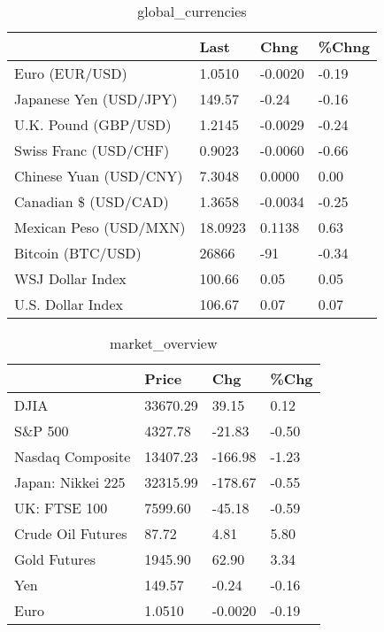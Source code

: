 \documentclass{article}%
\begin{document}
%


\begin{table}[htbp]%
\caption{global\_currencies}%
\centering%
\begin{adjustbox}{width=1\textwidth}%
\begin{tabular}{llll}
\toprule
                       &    Last &    Chng & \%Chng \\
\midrule
        Euro (EUR/USD) &  1.0510 & -0.0020 & -0.19 \\
Japanese Yen (USD/JPY) &  149.57 &   -0.24 & -0.16 \\
  U.K. Pound (GBP/USD) &  1.2145 & -0.0029 & -0.24 \\
 Swiss Franc (USD/CHF) &  0.9023 & -0.0060 & -0.66 \\
Chinese Yuan (USD/CNY) &  7.3048 &  0.0000 &  0.00 \\
  Canadian \$ (USD/CAD) &  1.3658 & -0.0034 & -0.25 \\
Mexican Peso (USD/MXN) & 18.0923 &  0.1138 &  0.63 \\
     Bitcoin (BTC/USD) &   26866 &     -91 & -0.34 \\
      WSJ Dollar Index &  100.66 &    0.05 &  0.05 \\
     U.S. Dollar Index &  106.67 &    0.07 &  0.07 \\
\bottomrule
\end{tabular}
%
\end{adjustbox}%
\end{table}

%


\begin{table}[htbp]%
\caption{market\_overview}%
\centering%
\begin{adjustbox}{width=1\textwidth}%
\begin{tabular}{llll}
\toprule
                  &    Price &     Chg &  \%Chg \\
\midrule
             DJIA & 33670.29 &   39.15 &  0.12 \\
          S\&P 500 &  4327.78 &  -21.83 & -0.50 \\
 Nasdaq Composite & 13407.23 & -166.98 & -1.23 \\
Japan: Nikkei 225 & 32315.99 & -178.67 & -0.55 \\
     UK: FTSE 100 &  7599.60 &  -45.18 & -0.59 \\
Crude Oil Futures &    87.72 &    4.81 &  5.80 \\
     Gold Futures &  1945.90 &   62.90 &  3.34 \\
              Yen &   149.57 &   -0.24 & -0.16 \\
             Euro &   1.0510 & -0.0020 & -0.19 \\
\bottomrule
\end{tabular}
%
\end{adjustbox}%
\end{table}

%
\end{document}
